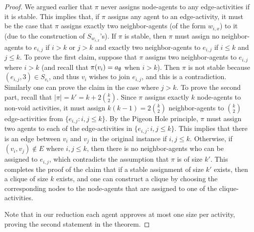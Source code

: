 \begin{proof}
	We argued earlier that $\pi$ never assigns node-agents to any edge-activities if it is stable. This implies that, if $\pi$ assigns any agent to an edge-activity, it must be the case that $\pi$ assigns exactly two neighbor-agents (of the form $w_{i,x}$) to it (due to the construction of $S_{w_{i,x}}$'s). If $\pi$ is stable, then $\pi$ must assign no neighbor-agents to $e_{i,j}$ if $i>k$ or $j>k$ and exactly two neighbor-agents to $e_{i,j}$ if $i\leq k$ and $j\leq k$. To prove the first claim, suppose that $\pi$ assigns two neighbor-agents to $e_{i,j}$ where $i>k$ (and recall that $\pi(v_i) = a_{\emptyset}$ when $i>k$). Then $\pi$ is not stable because $(e_{i,j}, 3) \in S_{v_i}$, and thus $v_i$ wishes to join $e_{i,j}$, and this is a contradiction. Similarly one can prove the claim in the case where $j>k$. To prove the second part, recall that $|\pi| = k' = k + 2\binom{k}{2}$. Since $\pi$ assigns exactly $k$ node-agents to non-void activities, it must assign $k(k-1) = 2\binom{k}{2}$ neighbor-agents to $\binom{k}{2}$ edge-activities from $\{e_{i,j}: i, j \leq k\}$. By the Pigeon Hole principle, $\pi$ must assign two agents to each of the edge-activities in $\{e_{i,j} : i,j \leq k\}$. This implies that there is an edge between $v_i$ and $v_j$ in the original instance if $i,j \leq k$. Otherwise, if $(v_i,v_j) \not\in E$ where $i,j \leq k$, then there is no neighbor-agents who can be assigned to $e_{i,j}$, which contradicts the assumption that $\pi$ is of size $k'$. This completes the proof of the claim that if a stable assignment of size $k'$ exists, then a clique of size $k$ exists, and one can construct a clique by choosing the corresponding nodes to the node-agents that are assigned to one of the clique-activities. 
	
	Note that in our reduction each agent approves at most one size per activity, proving the second statement in the theorem.
\end{proof}

